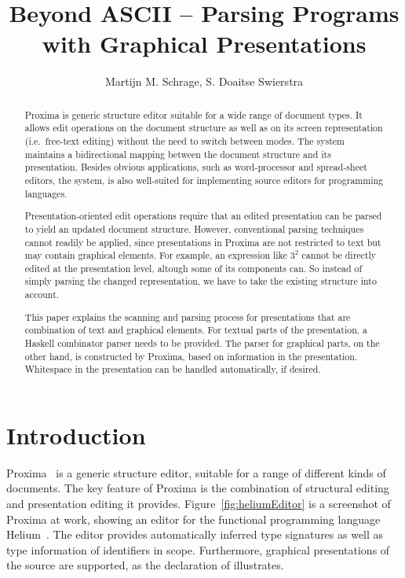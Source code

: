 \documentclass[12pt]{article}
\title{Beyond ASCII -- Parsing Programs with Graphical Presentations \\{\small \version}}
\author{Martijn M. Schrage\inst{1}, S. Doaitse Swierstra\inst{1}}
\begin{document}
 

\maketitle

\begin{abstract}


Proxima is generic structure editor suitable for a wide range of document types. It allows edit operations on the document structure as well as on its screen representation (i.e.\ free-text editing) without the need to switch between modes. The system maintains a bidirectional mapping between the document structure and its presentation. Besides obvious applications, such as word-processor and spread-sheet editors, the system, is also well-suited for implementing source editors for programming languages.

Presentation-oriented edit operations require that an edited presentation can be parsed to yield an updated document structure. However, conventional parsing techniques cannot readily be applied, since presentations in Proxima are not restricted to text but may contain graphical elements. For example, an expression like $3^2$ cannot be directly edited at the presentation level, altough some of its components can. So instead of simply parsing the changed representation, we have to take the existing structure into account. 

This paper explains the scanning and parsing process for presentations that are combination of text and graphical elements. For textual parts of the presentation, a Haskell combinator parser needs to be provided. The parser for graphical parts, on the other hand, is constructed by Proxima, based on information in the presentation. Whitespace in the presentation can be handled automatically, if desired. 
\end{abstract}


\section{Introduction}

Proxima~\cite{schrage04Proxima} is a generic structure editor, suitable for a range of different kinds of documents. The key feature of Proxima is the combination of structural editing and presentation editing it provides. Figure~\ref{fig:heliumEditor} is a screenshot of Proxima at work, showing an editor for the functional programming language Helium~\cite{heeren03helium}. The editor provides automatically inferred type signatures as well as type information of identifiers in scope. Furthermore, graphical presentations of the source are supported, as the declaration of  illustrates.
\end{document}

